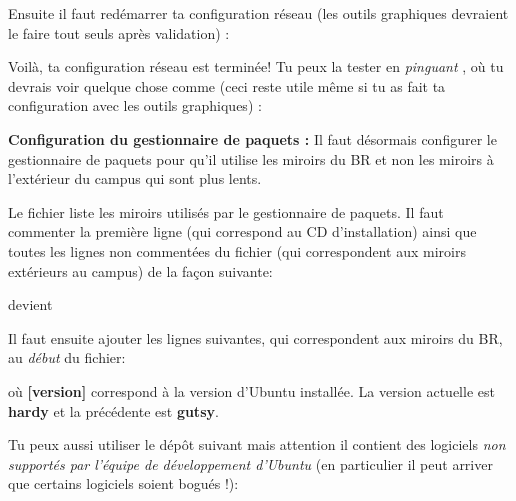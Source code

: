 Ensuite il faut red\'emarrer ta configuration r\'eseau (les outils graphiques devraient le faire tout seuls apr\`es validation) :


Voil\`a, ta configuration r\'eseau est termin\'ee! Tu peux la tester en \emph{pinguant} \fkz, o\`u tu devrais voir quelque chose comme (ceci reste utile m\^eme si tu
as fait ta configuration avec les outils graphiques) :


\label{ubuntu_mirror} {\bf Configuration du gestionnaire de paquets
:} Il faut d\'esormais configurer le gestionnaire de paquets pour
qu'il utilise les miroirs du BR et non les miroirs \`a l'ext\'erieur du
campus qui sont plus lents.

Le fichier  liste les miroirs utilis\'es par le gestionnaire de paquets. Il faut commenter la premi\`ere ligne (qui
correspond au CD d'installation) ainsi que toutes les lignes non comment\'ees du fichier (qui correspondent aux miroirs ext\'erieurs au campus) de la
fa\c{c}on suivante:


devient


Il faut ensuite ajouter les lignes suivantes, qui correspondent aux miroirs du BR, au \emph{d\'ebut} du fichier:


o\`u \textbf{[version]} correspond \`a la version d'Ubuntu install\'ee. La version actuelle est \textbf{hardy} et la pr\'ec\'edente est \textbf{gutsy}.

Tu peux aussi utiliser le d\'ep\^ot suivant mais attention il contient des logiciels \emph{non support\'es par l'\'equipe de d\'eveloppement d'Ubuntu} (en particulier il peut arriver que certains logiciels soient bogu\'es !):

